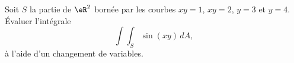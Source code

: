 \begin{exercice}\label{exodevoir2-0008}

Soit $S$ la partie de $\eR^2$ bornée par les courbes $xy=1$, $xy=2$, $y=3$ et $y=4$. Évaluer l'intégrale 
\[
\int\int_S \sin(xy)\, dA,
\] 
à l'aide d'un changement de variables. 

\end{exercice}

